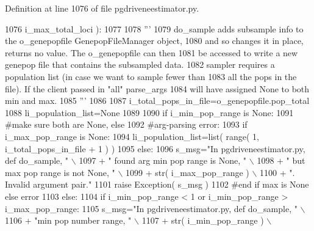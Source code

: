 Definition at line 1076 of file pgdriveneestimator.\+py.


\begin{DoxyCode}
1076                 i\_max\_total\_loci ):
1077 
1078     \textcolor{stringliteral}{'''}
1079 \textcolor{stringliteral}{    do\_sample adds subsample info to the o\_genepopfile GenepopFileManager object,}
1080 \textcolor{stringliteral}{    and so changes it in place, returns no value.  The o\_genepopfile can then}
1081 \textcolor{stringliteral}{    be accessed to write a new genepop file that contains the subsampled data.}
1082 \textcolor{stringliteral}{    sampler requires a population list (in case we want to sample fewer than}
1083 \textcolor{stringliteral}{    all the pops in the file). If the client passed in "all" parse\_args}
1084 \textcolor{stringliteral}{    will have assigned None to both min and max.}
1085 \textcolor{stringliteral}{    '''}
1086 
1087     i\_total\_pops\_in\_file=o\_genepopfile.pop\_total
1088     li\_population\_list=\textcolor{keywordtype}{None}
1089 
1090     \textcolor{keywordflow}{if} i\_min\_pop\_range \textcolor{keywordflow}{is} \textcolor{keywordtype}{None}:
1091         \textcolor{comment}{#make sure both are None, else}
1092         \textcolor{comment}{#arg-parsing error:}
1093         \textcolor{keywordflow}{if} i\_max\_pop\_range \textcolor{keywordflow}{is} \textcolor{keywordtype}{None}:
1094             li\_population\_list=list( range( 1, i\_total\_pops\_in\_file + 1 ) )
1095         \textcolor{keywordflow}{else}:
1096             s\_msg=\textcolor{stringliteral}{"In pgdriveneestimator.py, def do\_sample, "} \(\backslash\)
1097                         + \textcolor{stringliteral}{" found arg min pop range is None, "} \(\backslash\)
1098                         + \textcolor{stringliteral}{" but max pop range is not None, "} \(\backslash\)
1099                         + str( i\_max\_pop\_range ) \(\backslash\)
1100                         + \textcolor{stringliteral}{".  Invalid argument pair."}
1101             \textcolor{keywordflow}{raise} Exception( s\_msg )
1102         \textcolor{comment}{#end if max is None else error}
1103     \textcolor{keywordflow}{else}:
1104         \textcolor{keywordflow}{if} i\_min\_pop\_range < 1 \textcolor{keywordflow}{or} i\_min\_pop\_range > i\_max\_pop\_range:
1105             s\_msg=\textcolor{stringliteral}{"In pgdriveneestimator.py, def do\_sample, "} \(\backslash\)
1106                         + \textcolor{stringliteral}{"min pop number range, "} \(\backslash\)
1107                         + str( i\_min\_pop\_range ) \(\backslash\)

\end{DoxyCode}
